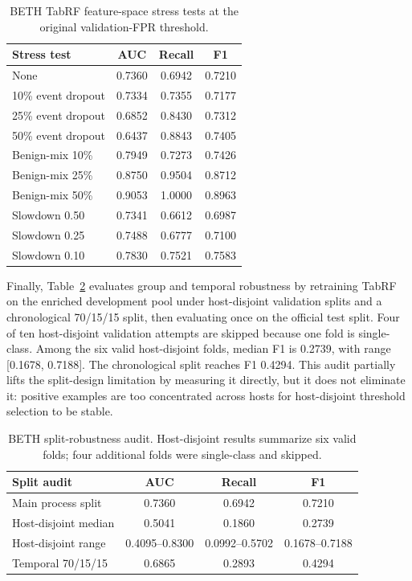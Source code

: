 \documentclass[10pt,journal,compsoc]{IEEEtran}
\begin{document}
\begin{table}[t]
\centering
\caption{BETH TabRF feature-space stress tests at the original validation-FPR threshold.}
\label{tab:beth_stress}
\begin{tabular}{lccc}
\toprule
\textbf{Stress test} & \textbf{AUC} & \textbf{Recall} & \textbf{F1} \\
\midrule
None & 0.7360 & 0.6942 & 0.7210 \\
10\% event dropout & 0.7334 & 0.7355 & 0.7177 \\
25\% event dropout & 0.6852 & 0.8430 & 0.7312 \\
50\% event dropout & 0.6437 & 0.8843 & 0.7405 \\
Benign-mix 10\% & 0.7949 & 0.7273 & 0.7426 \\
Benign-mix 25\% & 0.8750 & 0.9504 & 0.8712 \\
Benign-mix 50\% & 0.9053 & 1.0000 & 0.8963 \\
Slowdown 0.50 & 0.7341 & 0.6612 & 0.6987 \\
Slowdown 0.25 & 0.7488 & 0.6777 & 0.7100 \\
Slowdown 0.10 & 0.7830 & 0.7521 & 0.7583 \\
\bottomrule
\end{tabular}
\end{table}

Finally, Table~\ref{tab:beth_group_temporal} evaluates group and temporal robustness by retraining TabRF on the enriched development pool under host-disjoint validation splits and a chronological 70/15/15 split, then evaluating once on the official test split. Four of ten host-disjoint validation attempts are skipped because one fold is single-class. Among the six valid host-disjoint folds, median F1 is 0.2739, with range [0.1678, 0.7188]. The chronological split reaches F1 0.4294. This audit partially lifts the split-design limitation by measuring it directly, but it does not eliminate it: positive examples are too concentrated across hosts for host-disjoint threshold selection to be stable.

\begin{table}[t]
\centering
\caption{BETH split-robustness audit. Host-disjoint results summarize six valid folds; four additional folds were single-class and skipped.}
\label{tab:beth_group_temporal}
\begin{tabular}{lccc}
\toprule
\textbf{Split audit} & \textbf{AUC} & \textbf{Recall} & \textbf{F1} \\
\midrule
Main process split & 0.7360 & 0.6942 & 0.7210 \\
Host-disjoint median & 0.5041 & 0.1860 & 0.2739 \\
Host-disjoint range & 0.4095--0.8300 & 0.0992--0.5702 & 0.1678--0.7188 \\
Temporal 70/15/15 & 0.6865 & 0.2893 & 0.4294 \\
\bottomrule
\end{tabular}
\end{table}
\end{document}
